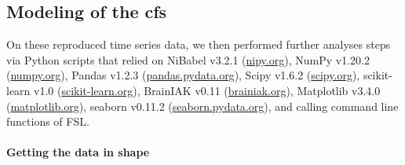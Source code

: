\subsection{Modeling of the \ac{cfs}}

On these reproduced time series data, we then performed further analyses steps
via Python scripts that relied on
%
NiBabel v3.2.1 (\href{https://nipy.org}{\url{nipy.org}}),
%
NumPy v1.20.2 (\href{https://numpy.org}{\url{numpy.org}}),
%
Pandas v1.2.3 (\href{https://pandas.pydata.org}{\url{pandas.pydata.org}}),
%
Scipy v1.6.2 (\href{https://scipy.org}{\url{scipy.org}}),
%
scikit-learn v1.0 (\href{https://scikit-learn.org}{\url{scikit-learn.org}}),
%
BrainIAK v0.11 (\href{https://brainiak.org}{\url{brainiak.org}}),
%
Matplotlib v3.4.0 (\href{https://matplotlib.org}{\url{matplotlib.org}}),
%
seaborn v0.11.2 (\href{https://seaborn.pydata.org}{\url{seaborn.pydata.org}}),
%
and calling command line functions of FSL.








\paragraph{Getting the data in shape}

